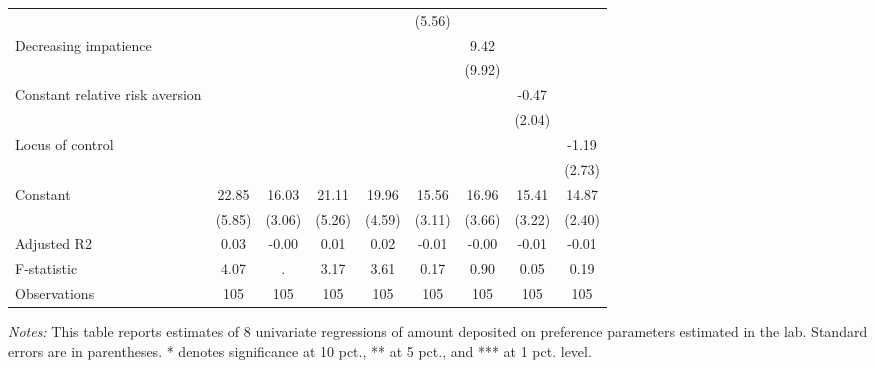 \begin{table}[htbp]
{\begin{threeparttable}
\begin{tabular}{l*{8}{c}}
                &                  &                  &                  &                  &   (5.56)         &                  &                  &                  \\
Decreasing impatience&                  &                  &                  &                  &                  &     9.42         &                  &                  \\
                &                  &                  &                  &                  &                  &   (9.92)         &                  &                  \\
Constant relative risk aversion&                  &                  &                  &                  &                  &                  &    -0.47         &                  \\
                &                  &                  &                  &                  &                  &                  &   (2.04)         &                  \\
Locus of control&                  &                  &                  &                  &                  &                  &                  &    -1.19         \\
                &                  &                  &                  &                  &                  &                  &                  &   (2.73)         \\
Constant        &    22.85\sym{***}&    16.03\sym{***}&    21.11\sym{***}&    19.96\sym{***}&    15.56\sym{***}&    16.96\sym{***}&    15.41\sym{***}&    14.87\sym{***}\\
                &   (5.85)         &   (3.06)         &   (5.26)         &   (4.59)         &   (3.11)         &   (3.66)         &   (3.22)         &   (2.40)         \\
\midrule
Adjusted R2     &     0.03         &    -0.00         &     0.01         &     0.02         &    -0.01         &    -0.00         &    -0.01         &    -0.01         \\
F-statistic     &     4.07         &        .         &     3.17         &     3.61         &     0.17         &     0.90         &     0.05         &     0.19         \\
Observations    &      105         &      105         &      105         &      105         &      105         &      105         &      105         &      105         \\
\bottomrule \end{tabular} \begin{tablenotes}[flushleft] \footnotesize \item \emph{Notes:} This table reports estimates of 8 univariate regressions of amount deposited on preference parameters estimated in the lab. Standard errors are in parentheses. * denotes significance at 10 pct., ** at 5 pct., and *** at 1 pct. level. \end{tablenotes} \end{threeparttable} } \end{table}
